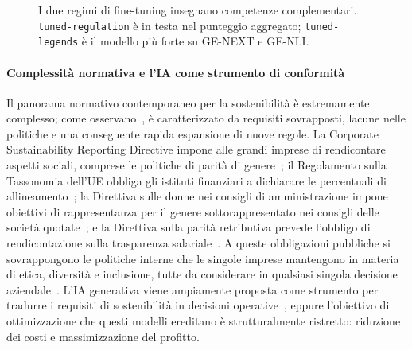 \documentclass[pdflatex, sn-apa]{sn-jnl}%
\theoremstyle{thmstyleone}%
\theoremstyle{thmstyletwo}%
\theoremstyle{thmstylethree}%
\newcommand{\modellegends}{\texttt{tuned-legends}}
\newcommand{\modelreg}{\texttt{tuned-regulation}}
\begin{document}
\begin{figure}[t]
\centering
{}
\caption{I due regimi di fine-tuning insegnano competenze complementari.
\modelreg{} è in testa nel punteggio aggregato; \modellegends{} è il modello più
forte su GE-NEXT e GE-NLI.}
\label{fig:teaser}
\end{figure}
 

\paragraph{Complessità normativa e l'IA come strumento di conformità}
Il panorama normativo contemporaneo per la sostenibilità è estremamente
complesso; come osservano~\citet{sargsyan2025legends}, è caratterizzato da
requisiti sovrapposti, lacune nelle politiche e una conseguente rapida
espansione di nuove regole. La Corporate Sustainability Reporting Directive
impone alle grandi imprese di rendicontare aspetti sociali, comprese le
politiche di parità di genere~\citep{europeancommission2022csrd}; il Regolamento
sulla Tassonomia dell'UE obbliga gli istituti finanziari a dichiarare le
percentuali di allineamento~\citep{europeancommission2025taxonomy}; la Direttiva
sulle donne nei consigli di amministrazione impone obiettivi di rappresentanza
per il genere sottorappresentato nei consigli delle società
quotate~\citep{europeanparliament2022wob}; e la Direttiva sulla parità
retributiva prevede l'obbligo di rendicontazione sulla trasparenza
salariale~\citep{europeancommission2025equalpay}. A queste obbligazioni
pubbliche si sovrappongono le politiche interne che le singole imprese
mantengono in materia di etica, diversità e inclusione, tutte da considerare in
qualsiasi singola decisione aziendale~\citep{sargsyan2025legends}. L'IA
generativa viene ampiamente proposta come strumento per tradurre i requisiti di
sostenibilità in decisioni operative~\citep{storey2025genai}, eppure l'obiettivo
di ottimizzazione che questi modelli ereditano è strutturalmente ristretto:
riduzione dei costi e massimizzazione del profitto.
 
\end{document}
